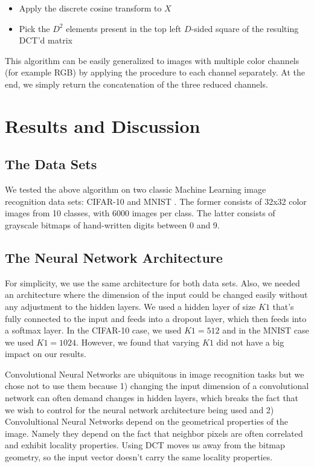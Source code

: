 \documentclass[12pt]{article}
\begin{document}
\begin{itemize}
  \item Apply the discrete cosine transform to $X$
  \item Pick the $D^2$ elements present in the top left $D$-sided square of the resulting DCT'd matrix
\end{itemize}

This algorithm can be easily generalized to images with multiple color channels (for example RGB) by applying the procedure to each channel separately. At the end, we simply return the concatenation of the three reduced channels.

\section{Results and Discussion} \label{results}

\subsection{The Data Sets}

We tested the above algorithm on two classic Machine Learning image recognition data sets: CIFAR-10 \cite{krizhevsky} and MNIST \cite{lecun}. The former consists of 32x32 color images from 10 classes, with 6000 images per class. The latter consists of grayscale bitmaps of hand-written digits between 0 and 9.

\subsection{The Neural Network Architecture}

For simplicity, we use the same architecture for both data sets. Also, we needed an architecture where the dimension of the input could be changed easily without any adjustment to the hidden layers. We used a hidden layer of size $K1$ that's fully connected to the input and feeds into a dropout layer, which then feeds into a softmax layer. In the CIFAR-10 case, we used $K1 = 512$ and in the MNIST case we used $K1 = 1024$. However, we found that varying $K1$ did not have a big impact on our results.

Convolutional Neural Networks are ubiquitous in image recognition tasks but we chose not to use them because 1) changing the input dimension of a convolutional network can often demand changes in hidden layers, which breaks the fact that we wish to control for the neural network architecture being used and 2) Convolultional Neural Networks depend on the geometrical properties of the image. Namely they depend on the fact that neighbor pixels are often correlated and exhibit locality properties. Using DCT moves us away from the bitmap geometry, so the input vector doesn't carry the same locality properties.
\end{document}
